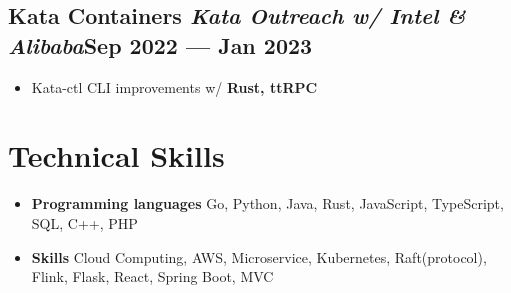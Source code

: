 \documentclass[a4,12pt]{article}
\newenvironment{zitemize}{
\begin{itemize}\itemsep0pt \parskip0pt \parsep1pt}
{\end{itemize}\vspace{-0.5cm}}
\begin{document}
\vspace{-0.2cm}

\subsection*{Kata Containers \normalfont\textit{Kata Outreach w/ Intel \& Alibaba}\hfill \textbf{Sep 2022 --- Jan 2023}} 
\begin{zitemize}
    \item Kata-ctl CLI improvements w/ \textbf{Rust, ttRPC}
\end{zitemize}





\vspace{-0.4cm}
\section{\textbf{Technical Skills}}
\vspace{-0.2cm}
\begin{zitemize}
    \item \textbf{Programming languages} Go, Python, Java, Rust, JavaScript, TypeScript, SQL, C++, PHP
    \item \textbf{Skills} Cloud Computing, AWS, Microservice, Kubernetes, Raft(protocol), Flink, Flask, React, Spring Boot, MVC
\end{zitemize}
\end{document}
